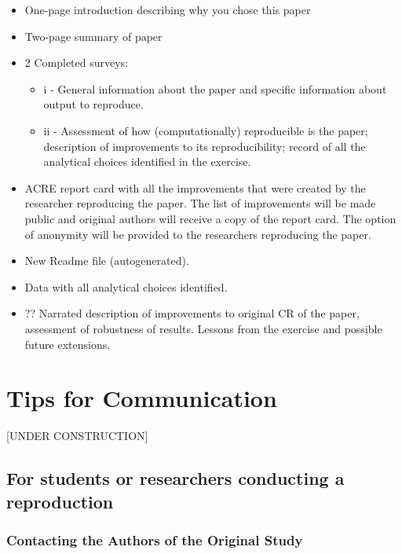 \documentclass[]{book}
\providecommand{\tightlist}{%
  \setlength{\itemsep}{0pt}\setlength{\parskip}{0pt}}
\begin{document}
\begin{itemize}
\item
  One-page introduction describing why you chose this paper
\item
  Two-page summary of paper
\item
  2 Completed surveys:

  \begin{itemize}
  \tightlist
  \item
    i - General information about the paper and specific
    information about output to reproduce.\\
  \item
    ii - Assessment of how (computationally) reproducible is the paper;
    description of improvements to its reproducibility; record of all the
    analytical choices identified in the exercise.
  \end{itemize}
\item
  ACRE report card with all the improvements that were created by the researcher reproducing the paper. The list of improvements will be made public and original authors will receive a copy of the report card. The option of anonymity will be provided to the researchers reproducing the paper.
\item
  New Readme file (autogenerated).
\item
  Data with all analytical choices identified.
\item
  ?? Narrated description of improvements to original CR of the paper, assessment of robustness of results. Lessons from the exercise and possible future extensions.
\end{itemize}

\hypertarget{tips-for-communication}{%
\chapter{Tips for Communication}\label{tips-for-communication}}

{[}UNDER CONSTRUCTION{]}

\hypertarget{for-students-or-researchers-conducting-a-reproduction}{%
\section{For students or researchers conducting a reproduction}\label{for-students-or-researchers-conducting-a-reproduction}}

\hypertarget{contacting-the-authors-of-the-original-study}{%
\subsection{Contacting the Authors of the Original Study}\label{contacting-the-authors-of-the-original-study}}
\end{document}
